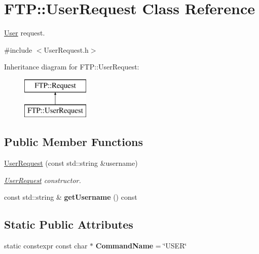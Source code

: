 \hypertarget{classFTP_1_1UserRequest}{}\section{F\+T\+P\+:\+:User\+Request Class Reference}
\label{classFTP_1_1UserRequest}


\hyperlink{structFTP_1_1User}{User} request.  




{\ttfamily \#include $<$User\+Request.\+h$>$}

Inheritance diagram for F\+T\+P\+:\+:User\+Request\+:\begin{figure}[H]
\begin{center}
\leavevmode
\includegraphics[height=2.000000cm]{classFTP_1_1UserRequest}
\end{center}
\end{figure}
\subsection*{Public Member Functions}
\begin{DoxyCompactItemize}
\item 
\hyperlink{classFTP_1_1UserRequest_a385e73c2e46f88f757c20748a0f52a0f}{User\+Request} (const std\+::string \&username)
\begin{DoxyCompactList}\small\item\em \hyperlink{classFTP_1_1UserRequest}{User\+Request} constructor. \end{DoxyCompactList}\item 
\hypertarget{classFTP_1_1UserRequest_a0a795f933d6b956aa1ea20e41f22f45b}{}const std\+::string \& {\bfseries get\+Username} () const \label{classFTP_1_1UserRequest_a0a795f933d6b956aa1ea20e41f22f45b}

\end{DoxyCompactItemize}
\subsection*{Static Public Attributes}
\begin{DoxyCompactItemize}
\item 
\hypertarget{classFTP_1_1UserRequest_a1d62befcdffbc41a256e92954fa0fb4c}{}static constexpr const char $\ast$ {\bfseries Command\+Name} = \char`\"{}U\+S\+E\+R\char`\"{}\label{classFTP_1_1UserRequest_a1d62befcdffbc41a256e92954fa0fb4c}

\end{DoxyCompactItemize}


